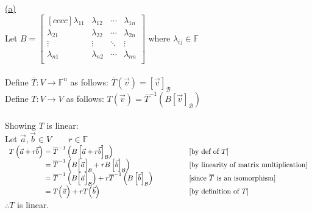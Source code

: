 \documentclass[12pt]{article}
\begin{document}
\hyperlink{toc}{\hypertarget{4.1}{(a)}}\\
Let $B = \begin{bmatrix}[cccc]
		\lambda_{11} & \lambda_{12} & \cdots & \lambda_{1n} \\
		\lambda_{21} & \lambda_{22} & \cdots & \lambda_{2n} \\
		\vdots       & \vdots       & \ddots & \vdots       \\
		\lambda_{n1} & \lambda_{n2} & \cdots & \lambda_{nn} \\
	\end{bmatrix}$ \qquad where $\lambda_{ij} \in \mathbb{F}$
\\\\
Define $\overline{T} : V \longrightarrow \mathbb{F}^n$ as follows: $\overline{T}(\vec{v}) = [\vec{v}]_\mathcal{B}$\\
Define $T : V \longrightarrow V$ as follows: $T(\vec{v}) = \overline{T}^{-1}(B[\vec{v}]_\mathcal{B})$
\\\\
Showing $T$ is linear:\\
Let $\vec{a}, \vec{b} \in V \qquad r\in \mathbb{F}$\\
$\begin{array}{r@{}>{\displaystyle}ll}
		T\left(\vec{a} + r\vec{b}\right) & {}= \overline{T}^{-1}\left(B\left[\vec{a} + r\vec{b} \right]_\mathcal{B}\right)                                                                    & [\text{by def of }T]                                   \\
		                                 & {}= \overline{T}^{-1}\left(B\Big[\vec{a}\Big]_\mathcal{B} + rB\left[\vec{b} \right]_\mathcal{B}\right)                                             & [\text{by linearity of matrix multiplication}]         \\
		                                 & {}= \overline{T}^{-1}\left(B\Big[\vec{a}\Big]_\mathcal{B}\right) + r\overline{T}^{-1}\left(B\left[\vec{b} \right]_\mathcal{B}\right) \qquad \qquad & [\text{since } \overline{T} \text{ is an isomorphism}] \\
		                                 & {}= T\Big(\vec{a}\Big) + rT\Big(\vec{b}\Big)                                                                                                       & [\text{by definition of }T]                            \\
	\end{array}$\\
$\therefore T$ is linear.
\\\\
\end{document}
